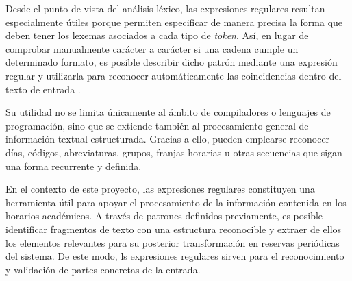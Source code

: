 Desde el punto de vista del análisis léxico, las expresiones regulares resultan especialmente útiles porque permiten especificar de manera precisa la forma que deben tener los lexemas asociados a cada tipo de \textit{token}. Así, en lugar de comprobar manualmente carácter a carácter si una cadena cumple un determinado formato, es posible describir dicho patrón mediante una expresión regular y utilizarla para reconocer automáticamente las coincidencias dentro del texto de entrada \cite{regex:manuel}.

Su utilidad no se limita únicamente al ámbito de compiladores o lenguajes de programación, sino que se extiende también al procesamiento general de información textual estructurada. Gracias a ello, pueden emplearse reconocer días, códigos, abreviaturas, grupos, franjas horarias u otras secuencias que sigan una forma recurrente y definida.

En el contexto de este proyecto, las expresiones regulares constituyen una herramienta útil para apoyar el procesamiento de la información contenida en los horarios académicos. A través de patrones definidos previamente, es posible identificar fragmentos de texto con una estructura reconocible y extraer de ellos los elementos relevantes para su posterior transformación en reservas periódicas del sistema. De este modo, ls expresiones regulares sirven para el reconocimiento y validación de partes concretas de la entrada.



